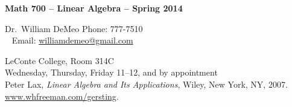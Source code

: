 \documentclass[12pt]{amsart}
\begin{document}
\thispagestyle{empty}

\begin{center} \textbf{Math 700 -- Linear Algebra -- Spring 2014}

 \end{center}
\vskip5mm

 Dr.~William DeMeo  \hfill {Phone: 777-7510}\\
~\phantom{XX} \hfill {Email: \href{mailto:williamdemeo@gmail.com}{williamdemeo@gmail.com}}

 LeConte College, Room 314C \\

 Wednesday, Thursday, Friday 11--12, and by appointment\\


 Peter Lax, \emph{Linear Algebra and Its Applications}, Wiley, New York, NY, 2007. \href{http://www.whfreeman.com/gersting}{www.whfreeman.com/gersting}. \\
\end{document}
